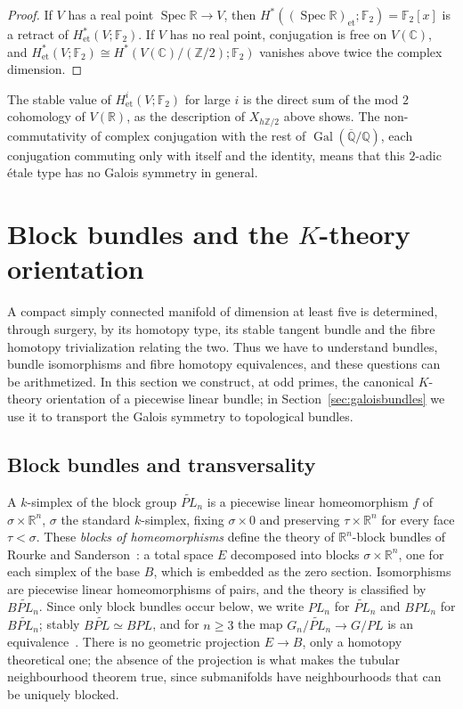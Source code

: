 \documentclass[11pt]{amsart}
\theoremstyle{plain}
\theoremstyle{definition}
\numberwithin{equation}{section}
\newcommand{\Z}{\mathbb{Z}}
\newcommand{\Q}{\mathbb{Q}}
\newcommand{\R}{\mathbb{R}}
\newcommand{\C}{\mathbb{C}}
\newcommand{\F}{\mathbb{F}}
\newcommand{\Qbar}{\overline{\mathbb{Q}}}
\DeclareMathOperator{\Gal}{Gal}
\DeclareMathOperator{\Spec}{Spec}
\begin{document}
\begin{proof}
If $V$ has a real point $\Spec\R\to V$, then $H^*((\Spec\R)_{\mathrm{et}};\F_2)=\F_2[x]$ is a retract of $H^*_{\mathrm{et}}(V;\F_2)$.
If $V$ has no real point, conjugation is free on $V(\C)$, and $H^*_{\mathrm{et}}(V;\F_2)\cong H^*(V(\C)/(\Z/2);\F_2)$ vanishes above twice the complex dimension.
\end{proof}

The stable value of $H^i_{\mathrm{et}}(V;\F_2)$ for large $i$ is the direct sum of the mod $2$ cohomology of $V(\R)$, as the description of $X_{h\Z/2}$ above shows.
The non-commutativity of complex conjugation with the rest of $\Gal(\Qbar/\Q)$, each conjugation commuting only with itself and the identity, means that this $2$-adic \'etale type has no Galois symmetry in general.


\section{Block bundles and the $K$-theory orientation}\label{sec:geometric}

A compact simply connected manifold of dimension at least five is determined, through surgery, by its homotopy type, its stable tangent bundle and the fibre homotopy trivialization relating the two.
Thus we have to understand bundles, bundle isomorphisms and fibre homotopy equivalences, and these questions can be arithmetized.
In this section we construct, at odd primes, the canonical $K$-theory orientation of a piecewise linear bundle; in Section~\ref{sec:galoisbundles} we use it to transport the Galois symmetry to topological bundles.

\subsection{Block bundles and transversality}
A $k$-simplex of the block group $\widetilde{PL}_n$ is a piecewise linear homeomorphism $f$ of $\sigma\times\R^n$, $\sigma$ the standard $k$-simplex, fixing $\sigma\times0$ and preserving $\tau\times\R^n$ for every face $\tau<\sigma$.
These \emph{blocks of homeomorphisms} define the theory of $\R^n$-block bundles of Rourke and Sanderson~\cite{RourkeSanderson}: a total space $E$ decomposed into blocks $\sigma\times\R^n$, one for each simplex of the base $B$, which is embedded as the zero section.
Isomorphisms are piecewise linear homeomorphisms of pairs, and the theory is classified by $B\widetilde{PL}_n$.
Since only block bundles occur below, we write $PL_n$ for $\widetilde{PL}_n$ and $BPL_n$ for $B\widetilde{PL}_n$; stably $B\widetilde{PL}\simeq BPL$, and for $n\ge3$ the map $G_n/\widetilde{PL}_n\to G/PL$ is an equivalence~\cite{RourkeSanderson}.
There is no geometric projection $E\to B$, only a homotopy theoretical one; the absence of the projection is what makes the tubular neighbourhood theorem true, since submanifolds have neighbourhoods that can be uniquely blocked.
\end{document}
